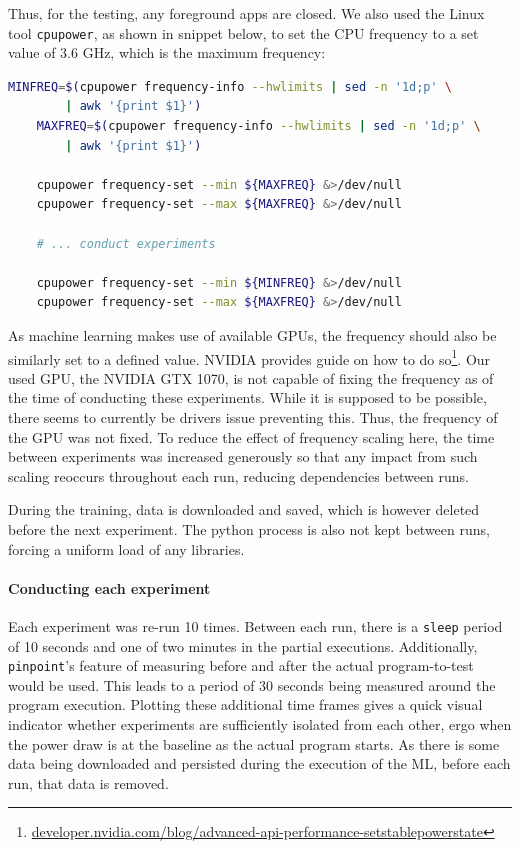 Thus, for the testing, any foreground apps are closed. We also used the Linux tool \verb|cpupower|, as shown in snippet below, to set the CPU frequency to a set value of 3.6 GHz, which is the maximum frequency:

\begin{minipage}{\linewidth}
\begin{lstlisting}[language=bash, frame=single, numbers=none, caption={Used operating system information}, basicstyle=\ttfamily]
    MINFREQ=$(cpupower frequency-info --hwlimits | sed -n '1d;p' \
        | awk '{print $1}')
    MAXFREQ=$(cpupower frequency-info --hwlimits | sed -n '1d;p' \
        | awk '{print $1}')
    
    cpupower frequency-set --min ${MAXFREQ} &>/dev/null
    cpupower frequency-set --max ${MAXFREQ} &>/dev/null

    # ... conduct experiments

    cpupower frequency-set --min ${MINFREQ} &>/dev/null
    cpupower frequency-set --max ${MAXFREQ} &>/dev/null
\end{lstlisting}
\label{listing:setting_cpu_frequency}
\end{minipage}

As machine learning makes use of available GPUs, the frequency should also be similarly set to a defined value. 
NVIDIA provides guide on how to do so\footnote{\url{developer.nvidia.com/blog/advanced-api-performance-setstablepowerstate}}.
Our used GPU, the NVIDIA GTX 1070, is not capable of fixing the frequency as of the time of conducting these experiments. 
While it is supposed to be possible, there seems to currently be drivers issue preventing this\webcite{web_powerlimitissue}.
Thus, the frequency of the GPU was not fixed. 
To reduce the effect of frequency scaling here, the time between experiments was increased generously so that any impact from such scaling reoccurs throughout each run, reducing dependencies between runs.

During the training, data is downloaded and saved, which is however deleted before the next experiment. 
The python process is also not kept between runs, forcing a uniform load of any libraries.

\paragraph{Conducting each experiment}

Each experiment was re-run 10 times. Between each run, there is a \verb|sleep| period of 10 seconds and one of two minutes in the partial executions. 
Additionally, \verb|pinpoint|'s feature of measuring before and after the actual program-to-test would be used. 
This leads to a period of 30 seconds being measured around the program execution. 
Plotting these additional time frames gives a quick visual indicator whether experiments are sufficiently isolated from each other, ergo when the power draw is at the baseline as the actual program starts. As there is some data being downloaded and persisted during the execution of the ML, before each run, that data is removed.

